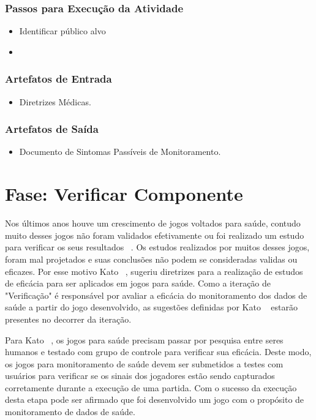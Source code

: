 \subsubsection{Passos para Execução da Atividade}
\begin{itemize}
	\item Identificar público alvo
	\item 
\end{itemize}

\subsubsection{Artefatos de Entrada}
\begin{itemize}
	\item Diretrizes Médicas.
\end{itemize}

\subsubsection{Artefatos de Saída}
\begin{itemize}
	\item Documento de Sintomas Passíveis de Monitoramento.
\end{itemize}

\section{Fase: Verificar Componente}
Nos últimos anos houve um crescimento de jogos voltados para saúde, contudo muito desses jogos não foram validados efetivamente ou foi realizado um estudo para verificar os seus resultados ~\cite{kato12}. Os estudos realizados por muitos desses jogos, foram mal projetados e suas conclusões não podem se consideradas validas ou eficazes. Por esse motivo Kato ~\cite{kato12}, sugeriu diretrizes para a realização de estudos de eficácia para ser aplicados em jogos para saúde. 
Como a iteração de "Verificação" é responsável por avaliar a eficácia do monitoramento dos dados de saúde a partir do jogo desenvolvido, as sugestões definidas por Kato ~\cite{kato12} estarão presentes no decorrer da iteração.

Para Kato ~\cite{kato12}, os jogos para saúde precisam passar por pesquisa entre seres humanos e testado com grupo de controle para verificar sua eficácia. Deste modo, os jogos para monitoramento de saúde devem ser submetidos a testes com usuários para verificar se os sinais dos jogadores estão sendo capturados corretamente durante a execução de uma partida. Com o sucesso da execução desta etapa pode ser afirmado que foi desenvolvido um jogo com o propósito de monitoramento de dados de saúde.

